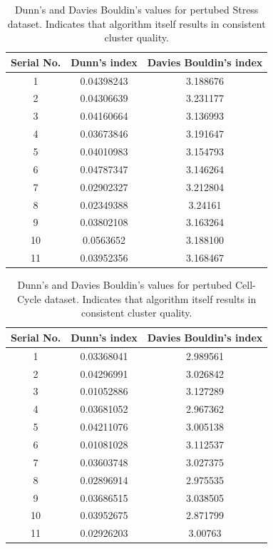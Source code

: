 \begin{table}
\centering
\begin{tabular}{|c|c|c|}
\hline
Serial No. & Dunn’s index  & Davies Bouldin’s index\\
\hline 
1 & 0.04398243 & 3.188676 \\
2 & 0.04306639 & 3.231177 \\
3 & 	0.04160664 & 3.136993 \\
4 & 	0.03673846 & 3.191647 \\
5 & 	0.04010983 & 3.154793 \\
6 & 	0.04787347 & 3.146264 \\
7 & 	0.02902327 & 3.212804 \\
8 & 	0.02349388 & 3.24161 \\
9 & 	0.03802108 & 3.163264 \\
10 & 	0.0563652 & 3.188100 \\
11 & 	0.03952356 & 3.168467 \\
\hline 
\end{tabular}
\caption{Dunn's and Davies Bouldin's values for pertubed Stress dataset. Indicates that algorithm itself results in consistent cluster quality.}
\label{tab:stress_only_perturb}
\end{table}

\begin{table}
\centering
\begin{tabular}{|c|c|c|}
\hline
Serial No. & Dunn’s index  & Davies Bouldin’s index\\
\hline
1 & 0.03368041 & 2.989561 \\
2 & 0.04296991 & 3.026842 \\
3 & 0.01052886 & 3.127289 \\
4 & 0.03681052 & 2.967362 \\
5 & 0.04211076 & 3.005138 \\
6 & 0.01081028 & 3.112537 \\
7 & 0.03603748 & 3.027375 \\
8 & 0.02896914 & 2.975535 \\
9 & 0.03686515 & 3.038505 \\
10 & 0.03952675 & 2.871799 \\
11 & 0.02926203 & 3.00763 \\
\hline 
\end{tabular}
\caption{Dunn's and Davies Bouldin's values for pertubed Cell-Cycle dataset. Indicates that algorithm itself results in consistent cluster quality.}
\label{tab:cellcycle_only_perturb}
\end{table}


